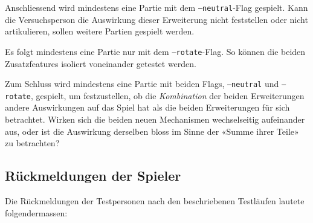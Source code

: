 \documentclass[a4paper,11pt,hidelinks]{scrartcl}
\begin{document}
Anschliessend wird mindestens eine Partie mit dem \texttt{--neutral}-Flag gespielt. Kann die Versuchsperson die Auswirkung dieser Erweiterung nicht feststellen oder nicht artikulieren, sollen weitere Partien gespielt werden.

Es folgt mindestens eine Partie nur mit dem \texttt{--rotate}-Flag. So können die beiden Zusatzfeatures isoliert voneinander getestet werden.

Zum Schluss wird mindestens eine Partie mit beiden Flags, \texttt{--neutral} und \texttt{--rotate}, gespielt, um festzustellen, ob die \textit{Kombination} der beiden Erweiterungen andere Auswirkungen auf das Spiel hat als die beiden Erweiterungen für sich betrachtet. Wirken sich die beiden neuen Mechanismen wechselseitig aufeinander aus, oder ist die Auswirkung derselben bloss im Sinne der «Summe ihrer Teile» zu betrachten?

\subsection{Rückmeldungen der Spieler}

Die Rückmeldungen der Testpersonen nach den beschriebenen Testläufen lautete folgendermassen:
\end{document}
